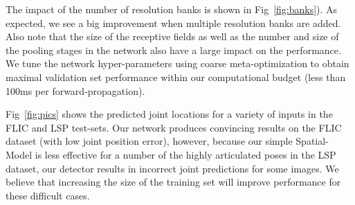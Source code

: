 The impact of the number of resolution banks is shown in Fig~\ref{fig:banks}). As expected, we see a big improvement when multiple resolution banks are added. Also note that the size of the receptive fields as well as the number and size of the pooling stages in the network also have a large impact on the performance. We tune the network hyper-parameters using coarse meta-optimization to obtain maximal validation set performance within our computational budget (less than 100ms per forward-propagation).

Fig~\ref{fig:pics} shows the predicted joint locations for a variety of inputs in the FLIC and LSP test-sets. Our network produces convincing results on the FLIC dataset (with low joint position error), however, because our simple Spatial-Model is less effective for a number of the highly articulated poses in the LSP dataset, our detector results in incorrect joint predictions for some images. We believe that increasing the size of the training set will improve performance for these difficult cases.


